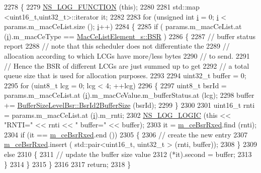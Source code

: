 \begin{DoxyCode}
2278 \{
2279   \hyperlink{log-macros-disabled_8h_a90b90d5bad1f39cb1b64923ea94c0761}{NS\_LOG\_FUNCTION} (\textcolor{keyword}{this});
2280 
2281   std::map <uint16\_t,uint32\_t>::iterator it;
2282 
2283   \textcolor{keywordflow}{for} (\textcolor{keywordtype}{unsigned} \textcolor{keywordtype}{int} \hyperlink{bernuolliDistribution_8m_a6f6ccfcf58b31cb6412107d9d5281426}{i} = 0; \hyperlink{bernuolliDistribution_8m_a6f6ccfcf58b31cb6412107d9d5281426}{i} < params.m\_macCeList.size (); \hyperlink{bernuolliDistribution_8m_a6f6ccfcf58b31cb6412107d9d5281426}{i}++)
2284     \{
2285       \textcolor{keywordflow}{if} ( params.m\_macCeList.at (\hyperlink{bernuolliDistribution_8m_a6f6ccfcf58b31cb6412107d9d5281426}{i}).m\_macCeType == \hyperlink{structns3_1_1MacCeListElement__s_a270a6526dfc7da02e9dc91823c290f6bac50796b01160b1825ec34efa1ad9f051}{MacCeListElement\_s::BSR} )
2286         \{
2287           \textcolor{comment}{// buffer status report}
2288           \textcolor{comment}{// note that this scheduler does not differentiate the}
2289           \textcolor{comment}{// allocation according to which LCGs have more/less bytes}
2290           \textcolor{comment}{// to send.}
2291           \textcolor{comment}{// Hence the BSR of different LCGs are just summed up to get}
2292           \textcolor{comment}{// a total queue size that is used for allocation purposes.}
2293 
2294           uint32\_t buffer = 0;
2295           \textcolor{keywordflow}{for} (uint8\_t lcg = 0; lcg < 4; ++lcg)
2296             \{
2297               uint8\_t bsrId = params.m\_macCeList.at (\hyperlink{bernuolliDistribution_8m_a6f6ccfcf58b31cb6412107d9d5281426}{i}).m\_macCeValue.m\_bufferStatus.at (lcg);
2298               buffer += \hyperlink{classns3_1_1BufferSizeLevelBsr_a67fc905f267ed8ac5a617fe229699122}{BufferSizeLevelBsr::BsrId2BufferSize} (bsrId);
2299             \}
2300 
2301           uint16\_t rnti = params.m\_macCeList.at (\hyperlink{bernuolliDistribution_8m_a6f6ccfcf58b31cb6412107d9d5281426}{i}).m\_rnti;
2302           \hyperlink{group__logging_ga88acd260151caf2db9c0fc84997f45ce}{NS\_LOG\_LOGIC} (\textcolor{keyword}{this} << \textcolor{stringliteral}{"RNTI="} << rnti << \textcolor{stringliteral}{" buffer="} << buffer);
2303           it = \hyperlink{classns3_1_1CqaFfMacScheduler_ae2ec92c28a8adb7f5d63d658fd1e3949}{m\_ceBsrRxed}.find (rnti);
2304           \textcolor{keywordflow}{if} (it == \hyperlink{classns3_1_1CqaFfMacScheduler_ae2ec92c28a8adb7f5d63d658fd1e3949}{m\_ceBsrRxed}.end ())
2305             \{
2306               \textcolor{comment}{// create the new entry}
2307               \hyperlink{classns3_1_1CqaFfMacScheduler_ae2ec92c28a8adb7f5d63d658fd1e3949}{m\_ceBsrRxed}.insert ( std::pair<uint16\_t, uint32\_t > (rnti, buffer));
2308             \}
2309           \textcolor{keywordflow}{else}
2310             \{
2311               \textcolor{comment}{// update the buffer size value}
2312               (*it).second = buffer;
2313             \}
2314         \}
2315     \}
2316 
2317   \textcolor{keywordflow}{return};
2318 \}
\end{DoxyCode}


